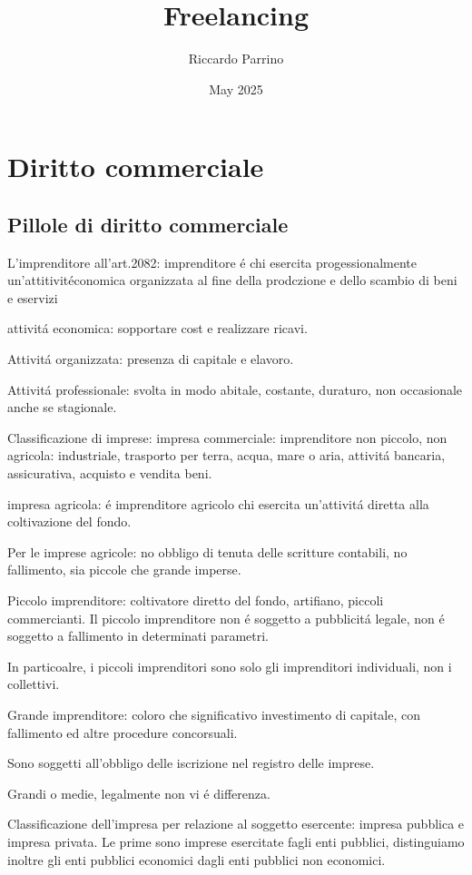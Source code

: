 \documentclass{article}
\title{Freelancing}
\author{Riccardo Parrino}
\date{May 2025}
\begin{document}
\maketitle

\section{Diritto commerciale}

\subsection{Pillole di diritto commerciale}

L'imprenditore all'art.2082: imprenditore \'e chi esercita progessionalmente un'attitivit\' economica organizzata al fine della prodczione e dello scambio di beni e eservizi

attivit\'a economica: sopportare cost e realizzare ricavi.

Attivit\'a organizzata: presenza di capitale e elavoro.

Attivit\'a professionale: svolta in modo abitale, costante, duraturo, non occasionale anche se stagionale.

Classificazione di imprese:
impresa commerciale: imprenditore non piccolo, non agricola: industriale, trasporto per terra, acqua, mare o aria, attivit\'a bancaria, assicurativa, acquisto e vendita beni.

impresa agricola: \'e imprenditore agricolo chi esercita un'attivit\'a diretta alla coltivazione del fondo.

Per le imprese agricole: no obbligo di tenuta delle scritture contabili, no fallimento, sia piccole che grande imperse.

Piccolo imprenditore: coltivatore diretto del fondo, artifiano, piccoli commercianti. Il piccolo imprenditore non \'e soggetto a pubblicit\'a legale,
non \'e soggetto a fallimento in determinati parametri.

In particoalre, i piccoli imprenditori sono solo gli imprenditori individuali, non i collettivi.

Grande imprenditore: coloro che significativo investimento di capitale, con fallimento ed altre procedure concorsuali.

Sono soggetti all'obbligo delle iscrizione nel registro delle imprese.

Grandi o medie, legalmente non vi \'e differenza.

Classificazione dell'impresa per relazione al soggetto esercente: impresa pubblica e impresa privata.
Le prime sono imprese esercitate fagli enti pubblici, distinguiamo inoltre gli enti pubblici economici dagli enti pubblici non economici.
\end{document}
